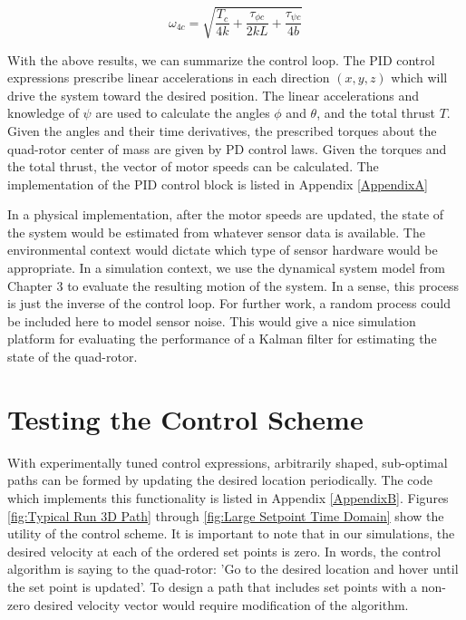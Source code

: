 \begin{equation}
    \omega_{4c} = \sqrt{ \frac{T_c}{4 k} + \frac{ \tau_{\phi c}}{2 k L}   + \frac{ \tau_{\psi c} }{4 b } }
\end{equation}


With the above results, we can summarize the control loop. The PID control expressions prescribe linear accelerations in each direction $(x,y,z)$ which will drive the system toward the desired position. The linear accelerations and knowledge of $\psi$ are used to calculate the angles $\phi$ and $\theta$, and the total thrust $T$. Given the angles and their time derivatives, the prescribed torques about the quad-rotor center of mass are given by PD control laws. Given the torques and the total thrust, the vector of motor speeds can be calculated. The implementation of the PID control block is listed in Appendix \ref{AppendixA}


In a physical implementation, after the motor speeds are updated, the state of the system would be estimated from whatever sensor data is available. The environmental context would dictate which type of sensor hardware would be appropriate. In a simulation context, we use the dynamical system model from Chapter 3 to evaluate the resulting motion of the system. In a sense, this process is just the inverse of the control loop. For further work, a random process could be included here to model sensor noise. This would give a nice simulation platform for evaluating the performance of a Kalman filter for estimating the state of the quad-rotor.

\section{Testing the Control Scheme}

With experimentally tuned control expressions, arbitrarily shaped, sub-optimal paths can be formed by updating the desired location periodically. The code which implements this functionality is listed in Appendix \ref{AppendixB}. Figures \ref{fig:Typical Run 3D Path} through \ref{fig:Large Setpoint Time Domain} show the utility of the control scheme. It is important to note that in our simulations, the desired velocity at each of the ordered set points is zero. In words, the control algorithm is saying to the quad-rotor: 'Go to the desired location and hover until the set point is updated'. To design a path that includes set points with a non-zero desired velocity vector would require modification of the algorithm.

